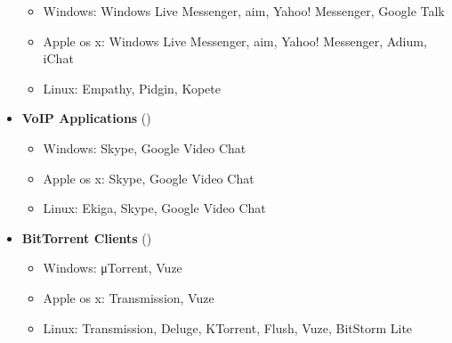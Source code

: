 \begin{latin}
\begin{itemize}
		\begin{itemize}
			\item Windows: Windows Live Messenger, aim, Yahoo! Messenger, Google Talk
			\item Apple os x: Windows Live Messenger, aim, Yahoo! Messenger, Adium, iChat
			\item Linux: Empathy, Pidgin, Kopete
		\end{itemize}
		\item \textbf{VoIP Applications} ()
		\begin{itemize}
			\item Windows: Skype, Google Video Chat
			\item Apple os x: Skype, Google Video Chat
			\item Linux: Ekiga, Skype, Google Video Chat
		\end{itemize}
		\item \textbf{BitTorrent Clients} ()
		\begin{itemize}
			\item Windows: μTorrent, Vuze
			\item Apple os x: Transmission, Vuze
			\item Linux: Transmission, Deluge, KTorrent, Flush, Vuze, BitStorm Lite
		\end{itemize}
	\end{itemize}
\end{latin}
